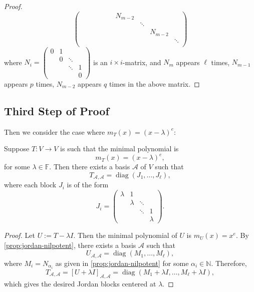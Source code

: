 \begin{proof}
$$\begin{pmatrix}
    & & & & & & N_{m-2} \\
    & & & & & & & \ddots \\
    & & & & & & & & N_{m-2} \\
    & & & & & & & & & \ddots \\
\end{pmatrix}$$
where $N_i = \begin{pmatrix}
0 & 1       &        &        \\
        & 0 & \ddots &        \\
        &         & \ddots & 1      \\
        &         &        & 0
\end{pmatrix}$ is an $i \times i$-matrix, and $N_m$ appears $\ell$ times, $N_{m-1}$ appears $p$ times, $N_{m-2}$ appears $q$ times in the above matrix.
\end{proof}

\subsection{Third Step of Proof}
Then we consider the case where \({m}_{T}\left( x\right)  = {\left( x - \lambda \right) }^{e}\):
\begin{corollary}
Suppose \( T : V \to V \) is such that the minimal polynomial is
\[
m_T(x) = (x - \lambda)^e,
\]
for some \( \lambda \in \mathbb{F} \). Then there exists a basis \( \mathcal{A} \) of \( V \) such that
\[
T_{\mathcal{A}, \mathcal{A}} = \operatorname{diag}(J_1, \ldots, J_\ell),
\]
where each block \( J_i \) is of the form
\[
J_i = \begin{pmatrix}
\lambda & 1       &        &        \\
        & \lambda & \ddots &        \\
        &         & \ddots & 1      \\
        &         &        & \lambda
\end{pmatrix}.
\]
\end{corollary}

\begin{proof}
Let \( U := T - \lambda I \). Then the minimal polynomial of \( U \) is \( m_U(x) = x^e \). By \autoref{prop:jordan-nilpotent}, there exists a basis \( \mathcal{A} \) such that
\[
U_{\mathcal{A}, \mathcal{A}} = \operatorname{diag}(M_1, \ldots, M_\ell),
\]
where $M_i = N_{\alpha_i}$ as given in \autoref{prop:jordan-nilpotent} for some $\alpha_i \in \mathbb{N}$.  Therefore,
\[
T_{\mathcal{A}, \mathcal{A}} = [U + \lambda I]_{\mathcal{A}, \mathcal{A}} = \operatorname{diag}(M_1 + \lambda I, \ldots, M_\ell + \lambda I),
\]
which gives the desired Jordan blocks centered at \( \lambda \).
\end{proof}

